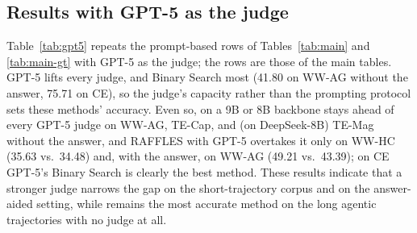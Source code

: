 \subsection{Results with GPT-5 as the judge}
\label{app:prompting-gpt5}

Table~\ref{tab:gpt5} repeats the prompt-based rows of Tables~\ref{tab:main} and
\ref{tab:main-gt} with GPT-5 as the judge; the \soap{} rows are those of the main
tables. GPT-5 lifts every judge, and Binary Search most (41.80 on WW-AG without the
answer, 75.71 on CE), so the judge's capacity rather than the prompting protocol
sets these methods' accuracy. Even so, \soap{} on a 9B or 8B backbone stays ahead of
every GPT-5 judge on WW-AG, TE-Cap, and (on DeepSeek-8B) TE-Mag without the answer,
and RAFFLES with GPT-5 overtakes it only on WW-HC (35.63 vs.\ 34.48) and, with the
answer, on WW-AG (49.21 vs.\ 43.39); on CE GPT-5's Binary Search is clearly the best
method. These results indicate that a stronger judge narrows the gap on the
short-trajectory corpus and on the answer-aided setting, while \soap{} remains the
most accurate method on the long agentic trajectories with no judge at all.


